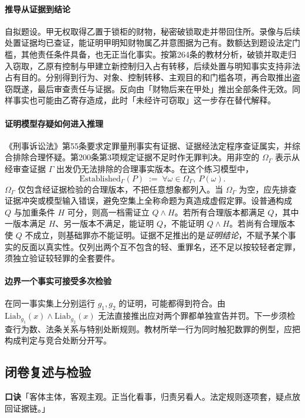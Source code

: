 \paragraph{推导\quad 从证据到结论}
自拟题设。甲无权取得乙置于锁柜的财物，秘密破锁取走并带回住所。录像与后续处置证据均已查证，能证明甲明知财物属乙并意图据为己有。数额达到题设法定门槛，其他责任条件具备，也无正当化事实。按第264条的教材分析，破锁并取走归入窃取，乙原有控制与甲建立新控制归入占有转移，后续处置与明知事实支持非法占有目的。分别得到行为、对象、控制转移、主观目的和门槛各项，再合取推出盗窃既遂，最后审查责任与证据。反向由「财物后来在甲处」推出全部条件无效。同样事实也可能由乙寄存造成，此时「未经许可窃取」这一步存在替代解释。

\paragraph{证明模型\quad 存疑如何进入推理}
《刑事诉讼法》第55条要求定罪量刑事实有证据、证据经法定程序查证属实，并综合排除合理怀疑。第200条第3项规定证据不足时作无罪判决。用非空的 \(\Omega_\Gamma\) 表示从经审查证据 \(\Gamma\) 出发仍无法排除的合理事实版本。在这个练习模型中，
\[
 \mathrm{Established}_{\Gamma}(P)
 \;:=\; \forall\omega\in\Omega_\Gamma,\ P(\omega).
\]
\(\Omega_\Gamma\) 仅包含经证据检验的合理版本，不把任意想象都列入。当 \(\Omega_\Gamma\) 为空，应先排查证据冲突或模型输入错误，避免空集上全称命题为真造成虚假定罪。设普通构成 \(Q\) 与加重条件 \(H\) 可分，则高一档需证立 \(Q\land H\)。若所有合理版本都满足 \(Q\)，其中一版本满足 \(H\)、另一版本不满足，能证明 \(Q\)，不能证明 \(Q\land H\)。若尚有合理版本使 \(Q\) 不成立，则基础罪亦不能证明。证据不足推出的是\emph{证明结论}，不赋予某个事实的反面以真实性。仅列出两个互不包含的轻、重罪名，还不足以按较轻者定罪，须独立验证较轻罪的全套要件。

\paragraph{边界\quad 一个事实可接受多次检验}
在同一事实集上分别运行 \(g_1,g_2\) 的证明，可能都得到符合。由 \(\mathrm{Liab}_{g_1}(x)\land\mathrm{Liab}_{g_2}(x)\) 无法直接推出应对两个罪都单独宣告并罚。下一步须检查行为数、法条关系与特别处断规则。教材所举一行为同时触犯数罪的例型，应把构成判定与竞合处断分开写。

\subsection*{闭卷复述与检验}
\textbf{口诀}\quad「客体主体，客观主观。正当化看事，归责另看人。法定规则逐项套，疑点放回证据链。」

